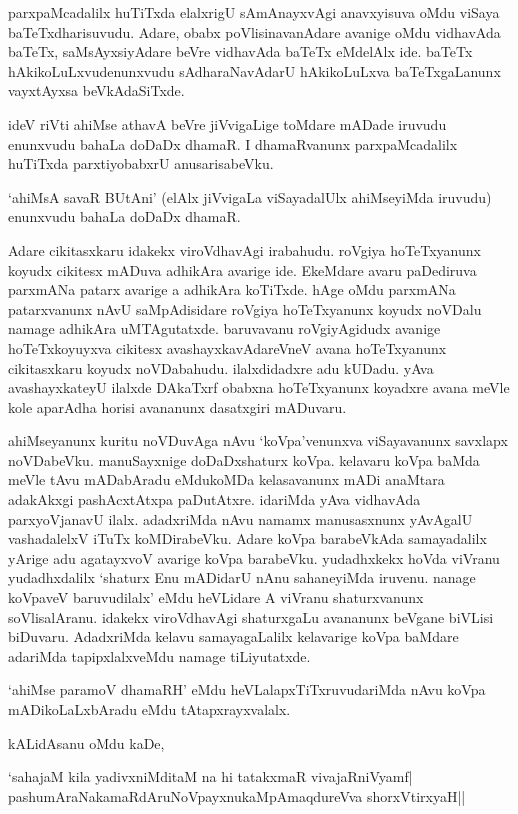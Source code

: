 parxpaMcadalilx huTiTxda elalxrigU sAmAnayxvAgi anavxyisuva oMdu viSaya baTeTxdharisuvudu. Adare, obabx poVlisinavanAdare avanige oMdu vidhavAda baTeTx, saMsAyxsiyAdare beVre vidhavAda baTeTx eMdelAlx ide. baTeTx hAkikoLuLxvudenunxvudu sAdharaNavAdarU hAkikoLuLxva baTeTxgaLanunx vayxtAyxsa beVkAdaSiTxde.

ideV riVti ahiMse athavA beVre jiVvigaLige toMdare mADade iruvudu enunxvudu bahaLa doDaDx dhamaR. I dhamaRvanunx parxpaMcadalilx huTiTxda parxtiyobabxrU anusarisabeVku.

`ahiMsA savaR BUtAni' (elAlx jiVvigaLa viSayadalUlx ahiMseyiMda iruvudu) enunxvudu bahaLa doDaDx dhamaR.

Adare cikitasxkaru idakekx viroVdhavAgi irabahudu. roVgiya hoTeTxyanunx koyudx cikitesx mADuva adhikAra avarige ide. EkeMdare avaru paDediruva parxmANa patarx avarige a adhikAra koTiTxde. hAge oMdu parxmANa patarxvanunx nAvU saMpAdisidare roVgiya hoTeTxyanunx koyudx noVDalu namage adhikAra uMTAgutatxde. baruvavanu roVgiyAgidudx avanige hoTeTxkoyuyxva cikitesx avashayxkavAdareVneV avana hoTeTxyanunx cikitasxkaru koyudx noVDabahudu. ilalxdidadxre adu kUDadu. yAva avashayxkateyU ilalxde DAkaTxrf obabxna hoTeTxyanunx koyadxre avana meVle kole aparAdha horisi avananunx dasatxgiri mADuvaru.

ahiMseyanunx kuritu noVDuvAga nAvu `koVpa'venunxva viSayavanunx savxlapx noVDabeVku. manuSayxnige doDaDxshaturx koVpa. kelavaru koVpa baMda meVle tAvu mADabAradu eMdukoMDa kelasavanunx mADi anaMtara adakAkxgi pashAcxtAtxpa paDutAtxre. idariMda yAva vidhavAda parxyoVjanavU ilalx. adadxriMda nAvu namamx manusasxnunx yAvAgalU vashadalelxV iTuTx koMDirabeVku. Adare koVpa barabeVkAda samayadalilx yArige adu agatayxvoV avarige koVpa barabeVku. yudadhxkekx hoVda viVranu yudadhxdalilx `shaturx Enu mADidarU nAnu sahaneyiMda iruvenu. nanage koVpaveV baruvudilalx' eMdu heVLidare A viVranu shaturxvanunx soVlisalAranu. idakekx viroVdhavAgi shaturxgaLu avananunx beVgane biVLisi biDuvaru. AdadxriMda kelavu samayagaLalilx kelavarige koVpa baMdare adariMda tapipxlalxveMdu namage tiLiyutatxde.

`ahiMse paramoV dhamaRH' eMdu heVLalapxTiTxruvudariMda nAvu koVpa mADikoLaLxbAradu eMdu tAtapxrayxvalalx. 

kALidAsanu oMdu kaDe,

\begin{shloka}
`sahajaM kila yadivxniMditaM na hi tatakxmaR vivajaRniVyamf|\\
pashumAraNakamaRdAruNoV\s payxnukaMpAmaqdureVva shorxVtirxyaH|| 
\end{shloka}

